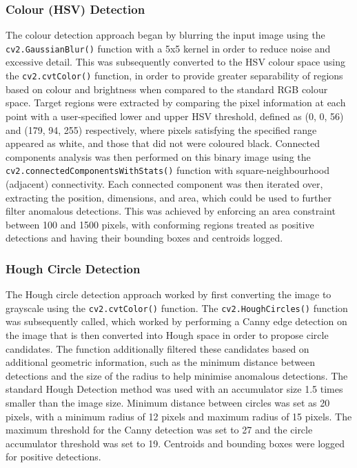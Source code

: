 \documentclass[10pt]{article}
\begin{document}
\vspace{0.5cm}

\clearpage

\subsubsection{Colour (HSV) Detection}
The colour detection approach began by blurring the input image using the \texttt{cv2.GaussianBlur()} function with a 5x5 kernel in order to reduce noise and excessive detail. This was subsequently converted to the HSV colour space using the \texttt{cv2.cvtColor()} function, in order to provide greater separability of regions based on colour and brightness when compared to the standard RGB colour space. Target regions were extracted by comparing the pixel information at each point with a user-specified lower and upper HSV threshold, defined as (0, 0, 56) and (179, 94, 255) respectively, where pixels satisfying the specified range appeared as white, and those that did not were coloured black. Connected components analysis was then performed on this binary image using the \texttt{cv2.connectedComponentsWithStats()} function with square-neighbourhood (adjacent) connectivity. Each connected component was then iterated over, extracting the position, dimensions, and area, which could be used to further filter anomalous detections. This was achieved by enforcing an area constraint between 100 and 1500 pixels, with conforming regions treated as positive detections and having their bounding boxes and centroids logged.

\subsubsection{Hough Circle Detection}
The Hough circle detection approach worked by first converting the image to grayscale using the \texttt{cv2.cvtColor()} function. The \texttt{cv2.HoughCircles()} function was subsequently called, which worked by performing a Canny edge detection \cite{canny1986computational} on the image that is then converted into Hough space in order to propose circle candidates. The function additionally filtered these candidates based on additional geometric information, such as the minimum distance between detections and the size of the radius to help minimise anomalous detections. The standard Hough Detection method was used with an accumulator size 1.5 times smaller than the image size. Minimum distance between circles was set as 20 pixels, with a minimum radius of 12 pixels and maximum radius of 15 pixels. The maximum threshold for the Canny detection was set to 27 and the circle accumulator threshold was set to 19. Centroids and bounding boxes were logged for positive detections.
\end{document}
